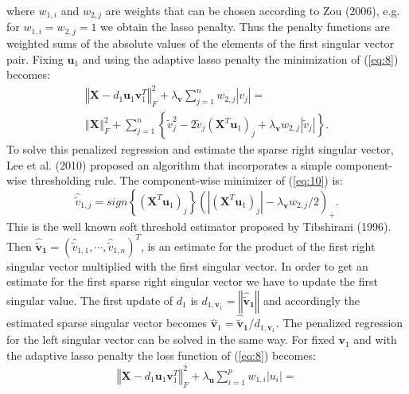 \documentclass{bioinfo}
\begin{document}
\begin{methods}
\begin{equation}
\end{equation}
where $w_{1,i}$ and $w_{2,j}$ are weights that can be chosen according to Zou (2006), \nocite{Zou2006}e.g. for $w_{1,i}=w_{2,j}=1$ we obtain the lasso penalty.
Thus the penalty functions are weighted sums of the absolute values of the elements of the first singular vector pair. 
\nocite{Tib1996}
Fixing $\mathbf{u}_{1}$ and using the adaptive lasso penalty the minimization of (\ref{eq:8}) becomes:
\begin{equation}
\begin{split}
\left\Vert \mathbf{X} - d_{1}\mathbf{u}_{1}\mathbf{v}_{1}^{T}\right\Vert_{F}^{2} + \lambda_{\mathbf{v}}\sum_{j=1}^{n}w_{2,j}|v_{j}|= \\
\left\Vert \mathbf{X} \right\Vert_{F}^{2} + \sum_{j=1}^{n} \left\{ \tilde{v}_{j}^2 - 2\tilde{v}_{j}(\mathbf{X}^{T}\mathbf{u}_{1})_{j} + \lambda_{\mathbf{v}} w_{2,j}|\tilde{v}_{j}|\right\}.
\end{split}   
\label{eq:10}      
\end{equation} 
To solve this penalized regression and estimate the sparse right singular vector, Lee et al. (2010) proposed an algorithm that incorporates a simple component-wise thresholding rule. The component-wise minimizer of (\ref{eq:10}) is:
\begin{equation}
\hat{\tilde{v}}_{1,j}=\textit{sign}\left\{(\mathbf{X}^{T}\mathbf{u}_{1})_{j}\right\}(|(\mathbf{X}^{T}\mathbf{u}_{1})_{j}|-\lambda_{\mathbf{v}}w_{2,j}/2)_{+}.
\end{equation}
This is the well known soft threshold estimator proposed by Tibshirani (1996)\nocite{Tibshirani1996}. Then $\mathbf{\hat{\tilde{v}}_{1}}=(\hat{\tilde{v}}_{1,1},\cdots,\hat{\tilde{v}}_{1,n})^{T}$, is an estimate for the product of the first right singular vector multiplied with the first singular vector. In order to get an estimate for the first sparse right singular vector we have to update the first singular value. The first update of $d_{1}$ is $d_{1,\mathbf{v}_{1}}=\left\Vert\mathbf{\hat{\tilde{v}}_{1}}\right\Vert$ and accordingly the estimated sparse singular vector becomes $\mathbf{\hat{v}}_{1}=\mathbf{\hat{\tilde{v}}_{1}}/d_{1,\mathbf{v}_{1}}$.
The penalized regression for the left singular vector can be solved in the same way. For fixed $\mathbf{v}_{1}$ and with the adaptive lasso penalty the loss function of (\ref{eq:8}) becomes:
\begin{equation}
\begin{split}
\left\Vert \mathbf{X} - d_{1}\mathbf{u}_{1}\mathbf{v}_{1}^{T}\right\Vert_{F}^{2} + \lambda_{\mathbf{u}}\sum_{i=1}^{p}w_{1,i}|u_{i}|= \\

\end{split}
\end{equation}
\end{methods}
\end{document}

